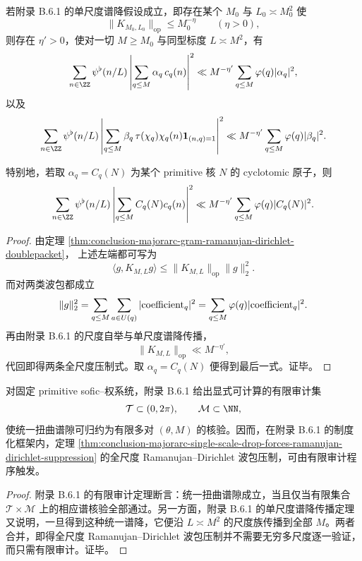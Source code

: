 \begin{theorem}\label{thm:conclusion-majorarc-single-scale-drop-forces-ramanujan-dirichlet-suppression}
若附录 B.6.1 的单尺度谱降假设成立，即存在某个 \(M_0\) 与 \(L_0\asymp M_0^2\) 使
\[
\|K_{M_0,L_0}\|_{\mathrm{op}}\le M_0^{-\eta}
\qquad (\eta>0),
\]
则存在 \(\eta'>0\)，使对一切 \(M\ge M_0\) 与同型标度 \(L\asymp M^2\)，有
\[
\sum_{n\in\ZZ}\psi^{\flat}(n/L)
\left|
\sum_{q\le M}\alpha_q\,c_q(n)
\right|^2
\ll
M^{-\eta'}
\sum_{q\le M}\varphi(q)|\alpha_q|^2,
\]
以及
\[
\sum_{n\in\ZZ}\psi^{\flat}(n/L)
\left|
\sum_{q\le M}\beta_q\,\tau(\chi_q)\chi_q(n)\mathbf 1_{(n,q)=1}
\right|^2
\ll
M^{-\eta'}
\sum_{q\le M}\varphi(q)|\beta_q|^2.
\]

特别地，若取 \(\alpha_q=C_q(N)\) 为某个 primitive 核 \(N\) 的 cyclotomic 原子，则
\[
\sum_{n\in\ZZ}\psi^{\flat}(n/L)
\left|
\sum_{q\le M}C_q(N)c_q(n)
\right|^2
\ll
M^{-\eta'}
\sum_{q\le M}\varphi(q)|C_q(N)|^2.
\]
\end{theorem}
\begin{proof}
由定理 \ref{thm:conclusion-majorarc-gram-ramanujan-dirichlet-doublepacket}，
上述左端都可写为
\[
\langle g,K_{M,L}g\rangle
\le
\|K_{M,L}\|_{\mathrm{op}}\|g\|_2^2.
\]
而对两类波包都成立
\[
\|g\|_2^2
=
\sum_{q\le M}\sum_{a\in U(q)}|{\rm coefficient}_q|^2
=
\sum_{q\le M}\varphi(q)|{\rm coefficient}_q|^2.
\]
再由附录 B.6.1 的尺度自举与单尺度谱降传播，
\[
\|K_{M,L}\|_{\mathrm{op}}\ll M^{-\eta'},
\]
代回即得两条全尺度压制式。取 \(\alpha_q=C_q(N)\) 便得到最后一式。证毕。
\end{proof}

\begin{proposition}\label{prop:conclusion-majorarc-finite-audit-suffices-for-global-wavepacket-suppression}
对固定 primitive sofic--权系统，附录 B.6.1 给出显式可计算的有限审计集
\[
\mathcal T\subset (0,2\pi),
\qquad
\mathcal M\subset \NN,
\]
使统一扭曲谱隙可归约为有限多对 \((\theta,M)\) 的核验。因而，在附录 B.6.1 的制度化框架内，定理 \ref{thm:conclusion-majorarc-single-scale-drop-forces-ramanujan-dirichlet-suppression} 的全尺度 Ramanujan--Dirichlet 波包压制，可由有限审计程序触发。
\end{proposition}
\begin{proof}
附录 B.6.1 的有限审计定理断言：统一扭曲谱隙成立，当且仅当有限集合 \(\mathcal T\times \mathcal M\) 上的相应谱核验全部通过。另一方面，附录 B.6.1 的单尺度谱降传播定理又说明，一旦得到这种统一谱降，它便沿 \(L\asymp M^2\) 的尺度族传播到全部 \(M\)。两者合并，即得全尺度 Ramanujan--Dirichlet 波包压制并不需要无穷多尺度逐一验证，而只需有限审计。证毕。
\end{proof}

